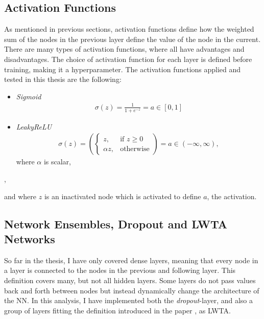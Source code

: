 \subsection{Activation Functions}\label{subsec:activation}
As mentioned in previous sections, activation functions define how the weighted sum of the nodes in the previous layer 
define the value of the node in the current. There are many types of activation functions, 
where all have advantages and disadvantages. The choice of activation function for each layer is defined
before training, making it a hyperparameter. The activation functions applied and tested in this thesis are the following:
\begin{center}
\begin{itemize}
    \item  \emph{Sigmoid}\\  
    \begin{align*}
         \sigma{(z)} = \frac{1}{1+e^{-z}} = a \in [0,1]
    \end{align*}
    \item \emph{LeakyReLU}
    \begin{align*}
        \sigma{(z)} = \left(
        \begin{cases}
            z,& \text{if } z\geq 0\\
            \alpha z,              & \text{otherwise}
        \end{cases}\right)
        = a \in (-\infty, \infty),
   \end{align*}
   where $\alpha$ is scalar, 
\end{itemize},
\end{center}
and where $z$ is an inactivated node which is activated to define $a$, the activation.

\subsection{Network Ensembles, Dropout and LWTA Networks}\label{subsec:LWTA}
So far in the thesis, I have only covered dense layers, meaning that every node in a layer 
is connected to the nodes in the previous and following layer. 
This definition covers many, but not all hidden layers. Some layers do not pass values back and forth between 
nodes but instead dynamically change the architecture of the \ac{NN}. In this analysis, 
I have implemented both the \emph{dropout}-layer, and also a group of layers fitting the definition 
introduced in the paper \cite{srivastava_compete_2013}, as \acf{LWTA}.
